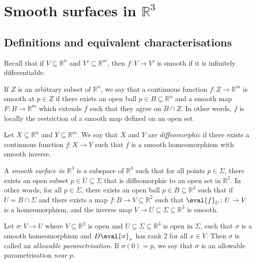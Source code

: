\section{Smooth surfaces in $\mathbb R^3$}

\subsection{Definitions and equivalent characterisations}
Recall that if $V \subseteq \mathbb R^n$ and $V' \subseteq \mathbb R^m$, then $f \colon V \to V'$ is smooth if it is infinitely differentiable.
\begin{definition}
	If $Z$ is an arbitrary subset of $\mathbb R^n$, we say that a continuous function $f \colon Z \to \mathbb R^m$ is smooth at $p \in Z$ if there exists an open ball $p \in B \subseteq \mathbb R^n$ and a smooth map $F \colon B \to \mathbb R^m$ which extends $f$ such that they agree on $B \cap Z$.
	In other words, $f$ is locally the restriction of a smooth map defined on an open set.
\end{definition}
\begin{definition}
	Let $X \subseteq \mathbb R^n$ and $Y \subseteq \mathbb R^m$.
	We say that $X$ and $Y$ are \textit{diffeomorphic} if there exists a continuous function $f \colon X \to Y$ such that $f$ is a smooth homeomorphism with smooth inverse.
\end{definition}
\begin{definition}
	A \textit{smooth surface in $\mathbb R^3$} is a subspace of $\mathbb R^3$ such that for all points $p \in \Sigma$, there exists an open subset $p \in U \subseteq \Sigma$ that is diffeomorphic to an open set in $\mathbb R^2$.
	In other words, for all $p \in \Sigma$, there exists an open ball $p \in B \subseteq \mathbb R^3$ such that if $U = B \cap \Sigma$ and there exists a map $f \colon B \to V \subseteq \mathbb R^2$ such that $\eval{f}_U \colon U \to V$ is a homeomorphism, and the inverse map $V \to U \subseteq \Sigma \subseteq \mathbb R^3$ is smooth.
\end{definition}
\begin{definition}
	Let $\sigma \colon V \to U$ where $V \subseteq \mathbb R^2$ is open and $U \subseteq \Sigma \subseteq \mathbb R^3$ is open in $\Sigma$, such that $\sigma$ is a smooth homeomorphism and $D \eval{\sigma}_x$ has rank 2 for all $x \in V$.
	Then $\sigma$ is called an \textit{allowable parametrisation}.
	If $\sigma(0) = p$, we say that $\sigma$ is an allowable parametrisation \textit{near} $p$.
\end{definition}
